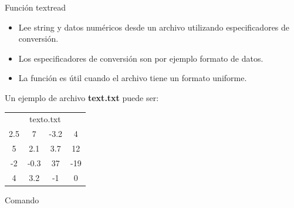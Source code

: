 \documentclass{bredelebeamer}
\begin{document}
\begin{frame}{Función textread}
\begin{itemize}
\item Lee string y datos numéricos desde un archivo utilizando especificadores de conversión.
\item Los especificadores de conversión son por ejemplo formato de datos.
\item La función es útil cuando el archivo tiene un formato uniforme.
\end{itemize}
Un ejemplo de archivo \textbf{text.txt} puede ser:
\begin{table}[]
\centering
\begin{tabular}{cccc}
\multicolumn{4}{c}{texto.txt} \\
2.5   & 7      & -3.2  & 4    \\
5     & 2.1    & 3.7   & 12   \\
-2    & -0.3   & 37    & -19  \\
4     & 3.2    & -1    & 0   
\end{tabular}
\end{table}
\begin{exampleblock}{Comando}

\end{exampleblock}

\end{frame}
\end{document}
